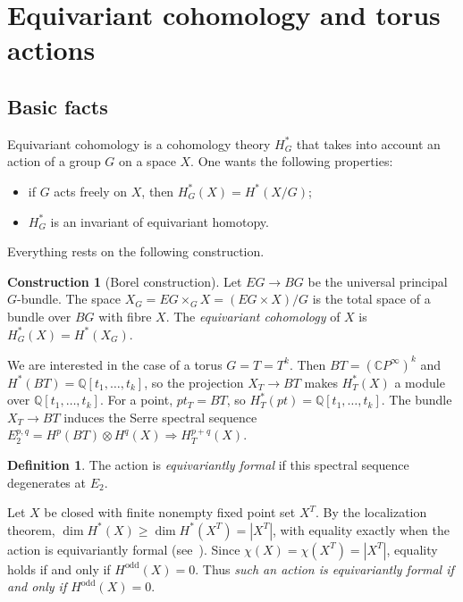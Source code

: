 \documentclass[11pt,a4paper]{article}
\numberwithin{equation}{section}
\theoremstyle{plain}
\theoremstyle{definition}
\newtheorem{definition}[theorem]{Definition}
\newtheorem{construction}[theorem]{Construction}
\theoremstyle{remark}
\newcommand{\Q}{\mathbb{Q}}
\newcommand{\C}{\mathbb{C}}
\newcommand{\HT}{H^{*}_{T}}
\begin{document}
\section{Equivariant cohomology and torus actions}\label{sec:equivariant}

\subsection{Basic facts}

Equivariant cohomology is a cohomology theory $H^*_G$ that takes into account an action of a group $G$ on a space $X$. One wants the following properties:
\begin{itemize}[nosep]
\item if $G$ acts freely on $X$, then $H^*_G(X)=H^*(X/G)$;
\item $H^*_G$ is an invariant of equivariant homotopy.
\end{itemize}
Everything rests on the following construction.

\begin{construction}[Borel construction]
Let $EG\to BG$ be the universal principal $G$-bundle. The space $X_G=EG\times_GX=(EG\times X)/G$ is the total space of a bundle over $BG$ with fibre $X$. The \emph{equivariant cohomology} of $X$ is $H^*_G(X)=H^*(X_G)$.
\end{construction}

We are interested in the case of a torus $G=T=T^k$. Then $BT=(\C P^\infty)^k$ and $H^*(BT)=\Q[t_1,\dots,t_k]$, so the projection $X_T\to BT$ makes $\HT(X)$ a module over $\Q[t_1,\dots,t_k]$. For a point, $pt_T=BT$, so $\HT(pt)=\Q[t_1,\dots,t_k]$. The bundle $X_T\to BT$ induces the Serre spectral sequence $E_2^{p,q}=H^p(BT)\otimes H^q(X)\Rightarrow H^{p+q}_T(X)$.

\begin{definition}
The action is \emph{equivariantly formal} if this spectral sequence degenerates at $E_2$.
\end{definition}

Let $X$ be closed with finite nonempty fixed point set $X^T$. By the localization theorem, $\dim H^*(X)\geqslant\dim H^*(X^T)=|X^T|$, with equality exactly when the action is equivariantly formal (see~\cite{GKM98}). Since $\chi(X)=\chi(X^T)=|X^T|$, equality holds if and only if $H^{\mathrm{odd}}(X)=0$. Thus \emph{such an action is equivariantly formal if and only if $H^{\mathrm{odd}}(X)=0$}.
\end{document}
